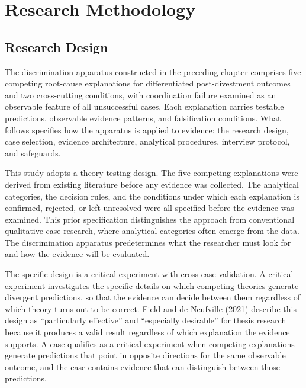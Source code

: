\hypertarget{research-methodology}{%
\chapter{Research Methodology}\label{research-methodology}}

\hypertarget{research-design}{%
\section{Research Design}\label{research-design}}

The discrimination apparatus constructed in the preceding chapter
comprises five competing root-cause explanations for differentiated
post-divestment outcomes and two cross-cutting conditions, with
coordination failure examined as an observable feature of all
unsuccessful cases. Each explanation carries testable predictions,
observable evidence patterns, and falsification conditions. What follows
specifies how the apparatus is applied to evidence: the research design,
case selection, evidence architecture, analytical procedures, interview
protocol, and safeguards.

This study adopts a theory-testing design. The five competing
explanations were derived from existing literature before any evidence
was collected. The analytical categories, the decision rules, and the
conditions under which each explanation is confirmed, rejected, or left
unresolved were all specified before the evidence was examined. This
prior specification distinguishes the approach from conventional
qualitative case research, where analytical categories often emerge from
the data. The discrimination apparatus predetermines what the researcher
must look for and how the evidence will be evaluated.

The specific design is a critical experiment with cross-case validation.
A critical experiment investigates the specific details on which
competing theories generate divergent predictions, so that the evidence
can decide between them regardless of which theory turns out to be
correct. Field and de Neufville (2021) describe this design as
``particularly effective'' and ``especially desirable'' for thesis
research because it produces a valid result regardless of which
explanation the evidence supports. A case qualifies as a critical
experiment when competing explanations generate predictions that point
in opposite directions for the same observable outcome, and the case
contains evidence that can distinguish between those predictions.

